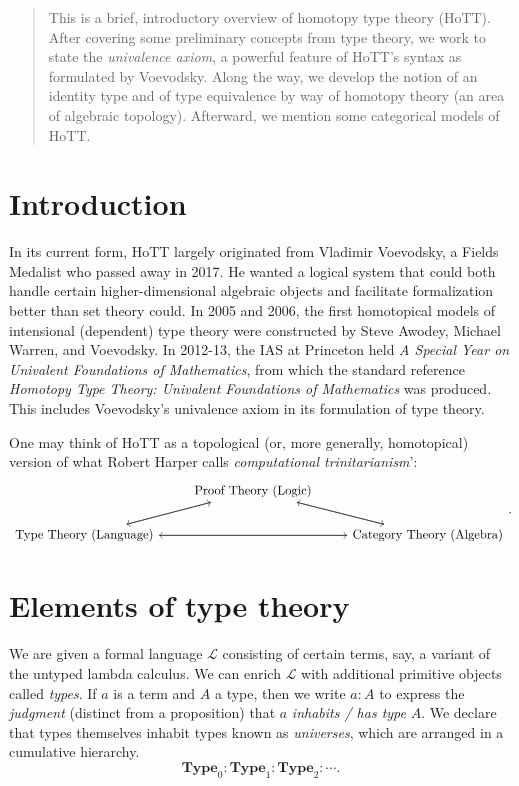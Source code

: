 \documentclass[10pt,letterpaper,cm]{nupset}
\theoremstyle{definition}
\theoremstyle{theorem}
\theoremstyle{remark}
\newcommand{\1}{\mathbf{1}}
\newcommand{\0}{\vec 0}
\begin{document}
\thispagestyle{empty}
\begin{abstract}
This is a brief, introductory overview of homotopy type theory (HoTT). After covering some preliminary concepts from type theory, we work to state the \textit{univalence axiom}, a powerful feature of HoTT's syntax as formulated by Voevodsky. Along the way, we develop the notion of an identity type and of type equivalence by way of homotopy theory (an area of algebraic topology). Afterward, we mention some categorical models of HoTT.
\end{abstract}



\tableofcontents
\newpage


\section*{Introduction}

In its current form, HoTT largely originated from Vladimir Voevodsky, a Fields Medalist who passed away in 2017. He wanted a logical system that could both handle certain higher-dimensional algebraic objects and facilitate formalization better than set theory could. In 2005 and 2006, the first homotopical models of intensional (dependent) type theory were constructed by Steve Awodey, Michael Warren, and Voevodsky. In 2012-13,  the IAS at Princeton held \textit{A Special Year on Univalent Foundations of Mathematics}, from which the standard reference \textit{Homotopy Type Theory: Univalent Foundations of Mathematics} was produced. This includes Voevodsky's univalence axiom in its formulation of type theory.

One may think of HoTT as a topological (or, more generally, homotopical) version of what Robert Harper calls \textit{computational trinitarianism}':
\[
\begin{tikzcd}
 & \text{Proof Theory (Logic)} \arrow[rd] \arrow[ld] &  \\
\text{Type Theory (Language)} \arrow[ru] \arrow[rr] &  & \text{Category Theory (Algebra)} \arrow[lu] \arrow[ll]
\end{tikzcd}
.\]

\section{Elements of type theory}

We are given a formal language $\mathcal{L}$ consisting of certain terms, say, a variant of the untyped lambda calculus. We can enrich $\mathcal{L}$ with additional primitive objects called \textit{types}. If $a$ is a term and $A$ a type, then we write $a: A$ to express the \textit{judgment} (distinct from a proposition) that $a$ \textit{inhabits / has type} $A$. We declare that types themselves inhabit types known as \textit{universes}, which are arranged in a cumulative hierarchy. $$\mathbf{Type}_0 :\mathbf{Type}_1 : \mathbf{Type}_2 : \cdots . $$ 
\end{document}
